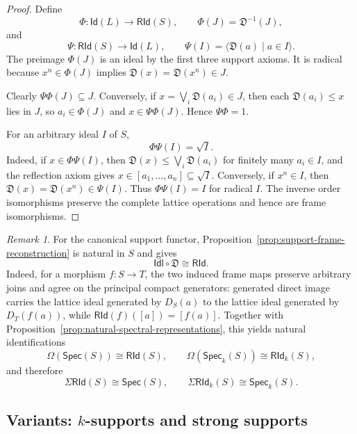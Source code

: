 \documentclass[12pt,leqno]{amsart}
\newcommand{\Spec}{\mathsf{Spec}}
\newcommand{\Speck}{\mathsf{Spec}_{k}}
\newcommand{\RId}{\mathsf{RId}}
\newcommand{\RIdk}{\mathsf{RId}_{k}}
\newcommand{\Id}{\mathsf{Id}}
\theoremstyle{definition}
\numberwithin{equation}{section}
\theoremstyle{remark}
\newtheorem{remark}[theorem]{Remark}
\def\leq{\leqslant}
\begin{document}
\begin{proof}
Define
\[
\Phi\colon\Id(L)\longrightarrow\RId(S),
\qquad
\Phi(J)=\mathfrak D^{-1}(J),
\]
and
\[
\Psi\colon\RId(S)\longrightarrow\Id(L),
\qquad
\Psi(I)=\langle\mathfrak D(a)\mid a\in I\rangle.
\]
The preimage \(\Phi(J)\) is an ideal by the first three support axioms. It is radical because
\(x^n\in\Phi(J)\) implies
\(\mathfrak D(x)=\mathfrak D(x^n)\in J\).

Clearly \(\Psi\Phi(J)\subseteq J\). Conversely, if
\(x=\bigvee_i\mathfrak D(a_i)\in J\), then each \(\mathfrak D(a_i)\leq x\) lies in $J$, so \(a_i\in\Phi(J)\) and \(x\in\Psi\Phi(J)\). Hence \(\Psi\Phi=1\).

For an arbitrary ideal $I$ of $S$,
\begin{equation}\label{eq:support-radical-closure}
\Phi\Psi(I)=\sqrt I.
\end{equation}
Indeed, if \(x\in\Phi\Psi(I)\), then
\(\mathfrak D(x)\leq\bigvee_i\mathfrak D(a_i)\) for finitely many \(a_i\in I\), and the reflection axiom gives
\(x\in[a_1,\ldots,a_n]\subseteq\sqrt I\). Conversely, if \(x^n\in I\), then
\(\mathfrak D(x)=\mathfrak D(x^n)\in\Psi(I)\). Thus \(\Phi\Psi(I)=I\) for radical $I$. The inverse order isomorphisms preserve the complete lattice operations and hence are frame isomorphisms.
\end{proof}

\begin{remark}\label{rem:natural-support-reconstruction}
For the canonical support functor, Proposition~\ref{prop:support-frame-reconstruction} is natural in $S$ and gives
\[
\mathsf{Idl}\circ\mathfrak D\cong\RId.
\]
Indeed, for a morphism \(f\colon S\to T\), the two induced frame maps preserve arbitrary joins and agree on the principal compact generators: generated direct image carries the lattice ideal generated by \(D_S(a)\) to the lattice ideal generated by \(D_T(f(a))\), while
\(\RId(f)([a])=[f(a)]\). Together with Proposition~\ref{prop:natural-spectral-representations}, this yields natural identifications
\[
\Omega(\Spec(S))\cong\RId(S),
\qquad
\Omega(\Speck(S))\cong\RIdk(S),
\]
and therefore
\[
\Sigma\RId(S)\cong\Spec(S),
\qquad
\Sigma\RIdk(S)\cong\Speck(S).
\]
\end{remark}

\subsection{Variants: \texorpdfstring{$k$}{k}-supports and strong supports}
\end{document}
